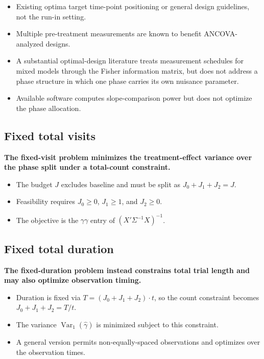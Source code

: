 \documentclass[
  11pt,
]{article}
\begin{document}
\begin{itemize}\setlength{\itemsep}{2pt}\setlength{\parskip}{0pt}
\item Existing optima target time-point positioning or general design guidelines, not the run-in setting.
\item Multiple pre-treatment measurements are known to benefit ANCOVA-analyzed designs.
\item A substantial optimal-design literature treats measurement schedules for mixed models through the Fisher information matrix, but does not address a phase structure in which one phase carries its own nuisance parameter.
\item Available software computes slope-comparison power but does not optimize the phase allocation.
\end{itemize}

\subsection{Fixed total visits}\label{fixed-total-visits}

\textbf{The fixed-visit problem minimizes the treatment-effect variance over the phase split under a total-count constraint.}

\begin{itemize}\setlength{\itemsep}{2pt}\setlength{\parskip}{0pt}
\item The budget $J$ excludes baseline and must be split as $J_0 + J_1 + J_2 = J$.
\item Feasibility requires $J_0 \ge 0$, $J_1 \ge 1$, and $J_2 \ge 0$.
\item The objective is the $\gamma\gamma$ entry of $(X'\Sigma^{-1}X)^{-1}$.
\end{itemize}

\subsection{Fixed total duration}\label{fixed-total-duration}

\textbf{The fixed-duration problem instead constrains total trial length and may also optimize observation timing.}

\begin{itemize}\setlength{\itemsep}{2pt}\setlength{\parskip}{0pt}
\item Duration is fixed via $T = (J_0 + J_1 + J_2) \cdot t$, so the count constraint becomes $J_0 + J_1 + J_2 = T/t$.
\item The variance $\mathop{\mathrm{Var}}_1(\hat\gamma)$ is minimized subject to this constraint.
\item A general version permits non-equally-spaced observations and optimizes over the observation times.
\end{itemize}
\end{document}
